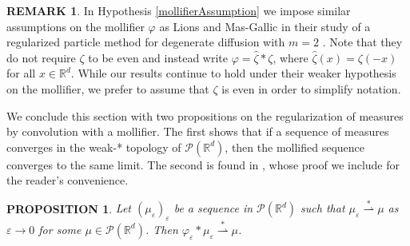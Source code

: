 \documentclass[11pt,leqno]{amsart}
\newtheorem{prop}[thm]{PROPOSITION}
\theoremstyle{definition}
\newtheorem{remark}[thm]{REMARK}
\newcommand{\R}{{\mathord{\mathbb R}}}
\newcommand{\Rd}{{\mathord{\mathbb R}^d}}
\newcommand{\wsto}{\stackrel{*}{\rightharpoonup}}
\def\P{{\mathcal P}}
\def\e{\varepsilon}
\begin{document}
\begin{remark}
	In Hypothesis \ref{mollifierAssumption} we impose similar assumptions on the mollifier $\varphi$ as Lions and Mas-Gallic in their study of a regularized particle method for degenerate diffusion with $m=2$ \cite{LionsMasGallic}. Note that they do not require $\zeta$ to be even and instead write $\varphi = \hat{\zeta}*\zeta$, where $\hat{\zeta}(x) = \zeta(-x)$ for all $x\in\R^d$. While our results continue to hold under their weaker hypothesis on the mollifier, we prefer to assume that $\zeta$ is even in order to simplify notation.
\end{remark}


We conclude this section with two propositions on the regularization of measures by convolution with a mollifier. The first shows that if a sequence of measures converges in the weak-* topology of $\P(\Rd)$, then the mollified sequence converges to the same limit. The second is found in \cite{LionsMasGallic}, whose proof we include for the reader's convenience.

\begin{prop} \label{narrow convergence mollified sequence}
	Let $(\mu_\e)_\e$ be a sequence in $\P(\R^d)$ such that $\mu_\e \wsto \mu$ as $\e\to0$ for some $\mu\in\P(\R^d)$. Then $\varphi_\e *\mu_\e \wsto \mu$.
\end{prop}
\end{document}
